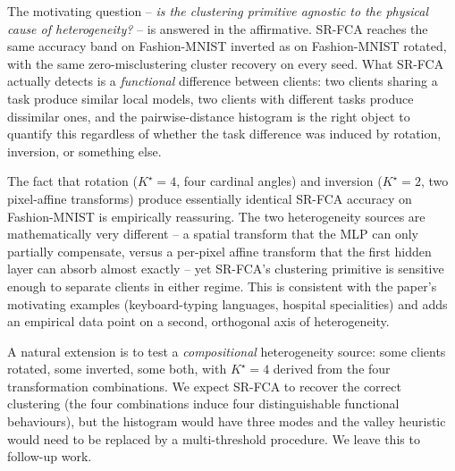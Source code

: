 The motivating question -- \emph{is the clustering primitive agnostic to the physical cause of heterogeneity?} -- is answered in the affirmative. SR-FCA reaches the same accuracy band on Fashion-MNIST inverted as on Fashion-MNIST rotated, with the same zero-misclustering cluster recovery on every seed. What SR-FCA actually detects is a \emph{functional} difference between clients: two clients sharing a task produce similar local models, two clients with different tasks produce dissimilar ones, and the pairwise-distance histogram is the right object to quantify this regardless of whether the task difference was induced by rotation, inversion, or something else.

The fact that rotation ($K^\star = 4$, four cardinal angles) and inversion ($K^\star = 2$, two pixel-affine transforms) produce essentially identical SR-FCA accuracy on Fashion-MNIST is empirically reassuring. The two heterogeneity sources are mathematically very different -- a spatial transform that the MLP can only partially compensate, versus a per-pixel affine transform that the first hidden layer can absorb almost exactly -- yet SR-FCA's clustering primitive is sensitive enough to separate clients in either regime. This is consistent with the paper's motivating examples (keyboard-typing languages, hospital specialities) and adds an empirical data point on a second, orthogonal axis of heterogeneity.

A natural extension is to test a \emph{compositional} heterogeneity source: some clients rotated, some inverted, some both, with $K^\star = 4$ derived from the four transformation combinations. We expect SR-FCA to recover the correct clustering (the four combinations induce four distinguishable functional behaviours), but the histogram would have three modes and the valley heuristic would need to be replaced by a multi-threshold procedure. We leave this to follow-up work.

